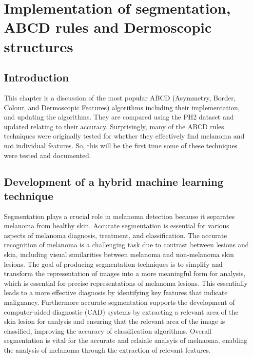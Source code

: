 
\chapter{Implementation of segmentation, ABCD rules  and Dermoscopic structures}

\section{Introduction}
This chapter is a discussion of the most popular ABCD (Asymmetry, Border, Colour, and Dermoscopic Features) algorithms including their implementation, and updating the algorithms. They are compared using the PH2 dataset and updated relating to their accuracy. Surprisingly, many of the ABCD rules techniques were originally tested for whether they effectively find melanoma and not individual features. So, this will be the first time some of these techniques were tested and documented.

\section{Development of a hybrid machine learning technique}
Segmentation plays a crucial role in melanoma detection because it separates melanoma from healthy skin. Accurate segmentation is essential for various aspects of melanoma diagnosis, treatment, and classification\cite{Albahli2020}. The accurate recognition of melanoma is a challenging task due to contrast between lesions and skin, including visual similarities between melanoma and non-melanoma skin lesions\cite{Skin Lesion Analysis towards Melanoma Detection Using Deep Learning Network}. The goal of producing segmentation techniques is to simplify and transform the representation of images into a more meaningful form for analysis, which is essential for precise representations of melanoma lesions\cite{Computer Aided Diagnostic Support System for Skin Cancer: A Review of Techniques and Algorithms}. This essentially leads to a more effective diagnosis by identifying key features that indicate malignancy\cite{An IoMT-Based Melanoma Lesion Segmentation Using Conditional Generative Adversarial Networks}. Furthermore accurate segmentation supports the development of computer-aided diagnostic (CAD) systems by extracting a relevant area of the skin lesion for analysis and ensuring that the relevant area of the image is classified, improving the accuracy of classification algorithms\cite{Step-wise integration of deep class-specific learning for dermoscopic image segmentation}. Overall segmentation is vital for the accurate and relaiale analsyis of melnaoma, enabling the analysis of melanoma through the extraction of relevant features.

